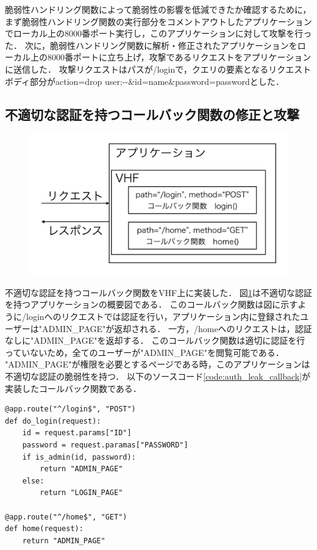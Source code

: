 \documentclass[a4paper,12pt]{jreport}
\begin{document}
脆弱性ハンドリング関数によって脆弱性の影響を低減できたか確認するために，まず脆弱性ハンドリング関数の実行部分をコメントアウトしたアプリケーションでローカル上の8000番ポート実行し，このアプリケーションに対して攻撃を行った．
次に，脆弱性ハンドリング関数に解析・修正されたアプリケーションをローカル上の8000番ポートに立ち上げ，攻撃であるリクエストをアプリケーションに送信した．
攻撃リクエストはパスが/loginで，クエリの要素となるリクエストボディ部分がaction=drop user;-\--\&id=name\&password=passwordとした．

\subsection{不適切な認証を持つコールバック関数の修正と攻撃}
\begin{figure}[ht]
  \begin{center}
    \includegraphics[clip, width=130mm]{./figures/improper_authC_app.png}
    \label{fig:improper_authC_app}
  \end{center}
\end{figure}
不適切な認証を持つコールバック関数をVHF上に実装した．
図\ref{fig:improper_authC_app}は不適切な認証を持つアプリケーションの概要図である．
このコールバック関数は図に示すように/loginへのリクエストでは認証を行い，アプリケーション内に登録されたユーザーは"ADMIN\_PAGE"が返却される．
一方，/homeへのリクエストは，認証なしに"ADMIN\_PAGE"を返却する．
このコールバック関数は適切に認証を行っていないため，全てのユーザーが"ADMIN\_PAGE"を閲覧可能である．
"ADMIN\_PAGE"が権限を必要とするページである時，このアプリケーションは不適切な認証の脆弱性を持つ．
以下のソースコード\ref{code:auth_leak_callback}が実装したコールバック関数である．
\begin{lstlisting}[caption={A vulnerable function which has an authentication leak.}, label=code:auth_leak_callback, captionpos=b]
@app.route("^/login$", "POST")
def do_login(request):
    id = request.params["ID"]
    password = request.paramas["PASSWORD"]
    if is_admin(id, password):
        return "ADMIN_PAGE"
    else:
        return "LOGIN_PAGE"

@app.route("^/home$", "GET")
def home(request):
    return "ADMIN_PAGE"
\end{lstlisting}
\end{document}
